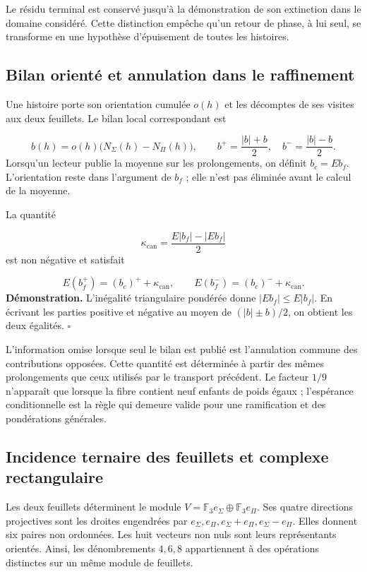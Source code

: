 Le résidu terminal est conservé jusqu'à la démonstration de son extinction dans le domaine considéré. Cette distinction empêche qu'un retour de phase, à lui seul, se transforme en une hypothèse d'épuisement de toutes les histoires.

\subsection{Bilan orienté et annulation dans le raffinement}
Une histoire porte son orientation cumulée \(o(h)\) et les décomptes de ses visites aux deux feuillets. Le bilan local correspondant est

\[
b(h)=o(h)\bigl(N_\Sigma(h)-N_\Pi(h)\bigr),
\qquad
b^+=\frac{|b|+b}{2},\quad b^-=\frac{|b|-b}{2}.
\]
Lorsqu'un lecteur publie la moyenne sur les prolongements, on définit \(b_c=Eb_f\). L'orientation reste dans l'argument de \(b_f\) ; elle n'est pas éliminée avant le calcul de la moyenne.

La quantité

\[
\kappa_{\mathrm{can}}=
\frac{E|b_f|-|Eb_f|}{2}
\]
est non négative et satisfait

\[
E(b_f^+)=(b_c)^++\kappa_{\mathrm{can}},
\qquad
E(b_f^-)=(b_c)^-+\kappa_{\mathrm{can}}.
\]
\textbf{Démonstration.} L'inégalité triangulaire pondérée donne \(|Eb_f|\leq E|b_f|\). En écrivant les parties positive et négative au moyen de \((|b|\pm b)/2\), on obtient les deux égalités. \hfill\(\square\)

L’information omise lorsque seul le bilan est publié est l’annulation commune des contributions opposées. Cette quantité est déterminée à partir des mêmes prolongements que ceux utilisés par le transport précédent. Le facteur \(1/9\) n’apparaît que lorsque la fibre contient neuf enfants de poids égaux ; l’espérance conditionnelle est la règle qui demeure valide pour une ramification et des pondérations générales.

\subsection{Incidence ternaire des feuillets et complexe rectangulaire}
Les deux feuillets déterminent le module \(V=\mathbb F_3e_\Sigma\oplus\mathbb F_3e_\Pi\). Ses quatre directions projectives sont les droites engendrées par \(e_\Sigma,e_\Pi,e_\Sigma+e_\Pi,e_\Sigma-e_\Pi\). Elles donnent six paires non ordonnées. Les huit vecteurs non nuls sont leurs représentants orientés. Ainsi, les dénombrements \(4,6,8\) appartiennent à des opérations distinctes sur un même module de feuillets.

